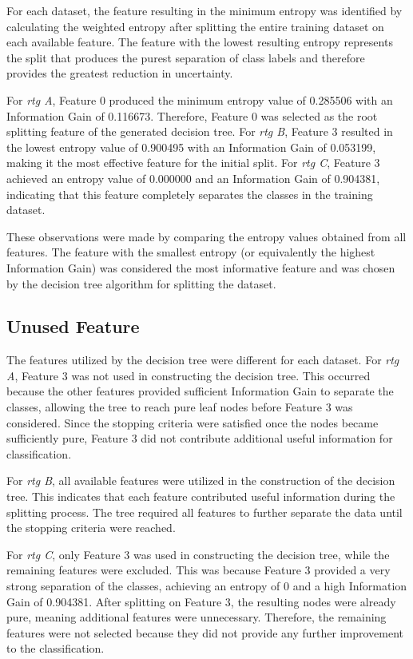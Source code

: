 \documentclass[a4paper,12pt]{article}
\begin{document}
For each dataset, the feature resulting in the minimum entropy was identified by
calculating the weighted entropy after splitting the entire training dataset on
each available feature. The feature with the lowest resulting entropy represents
the split that produces the purest separation of class labels and therefore
provides the greatest reduction in uncertainty.

For \textit{rtg A}, Feature 0 produced the minimum entropy value of 0.285506 with
an Information Gain of 0.116673. Therefore, Feature 0 was selected as the root
splitting feature of the generated decision tree. For \textit{rtg B}, Feature 3
resulted in the lowest entropy value of 0.900495 with an Information Gain of
0.053199, making it the most effective feature for the initial split. For
\textit{rtg C}, Feature 3 achieved an entropy value of 0.000000 and an Information
Gain of 0.904381, indicating that this feature completely separates the classes
in the training dataset.

These observations were made by comparing the entropy values obtained from all
features. The feature with the smallest entropy (or equivalently the highest
Information Gain) was considered the most informative feature and was chosen by
the decision tree algorithm for splitting the dataset.

\subsection{Unused Feature}
The features utilized by the decision tree were different for each dataset. For
\textit{rtg A}, Feature 3 was not used in constructing the decision tree. This
occurred because the other features provided sufficient Information Gain to
separate the classes, allowing the tree to reach pure leaf nodes before Feature
3 was considered. Since the stopping criteria were satisfied once the nodes
became sufficiently pure, Feature 3 did not contribute additional useful
information for classification.

For \textit{rtg B}, all available features were utilized in the construction of
the decision tree. This indicates that each feature contributed useful
information during the splitting process. The tree required all features to
further separate the data until the stopping criteria were reached.

For \textit{rtg C}, only Feature 3 was used in constructing the decision tree,
while the remaining features were excluded. This was because Feature 3 provided
a very strong separation of the classes, achieving an entropy of 0 and a high
Information Gain of 0.904381. After splitting on Feature 3, the resulting nodes
were already pure, meaning additional features were unnecessary. Therefore, the
remaining features were not selected because they did not provide any further
improvement to the classification.
\end{document}
